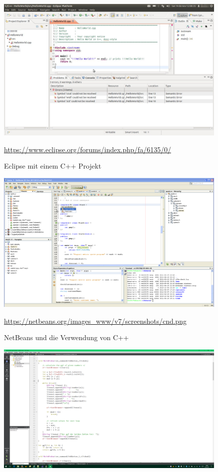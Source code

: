 \documentclass[a4paper]{report}
\begin{document}
\begin{center}
\begin{figure}
	\label{begin:ide:picts}
	\includegraphics[width = \textwidth]{01/eclipse.jpg}
	\caption{Eclipse mit einem C++ Projekt}
	\url{https://www.eclipse.org/forums/index.php/fa/6135/0/}
	\label{pic:eclipse}
\end{figure}
\begin{figure}
	\includegraphics[width = \textwidth]{01/netbeans.png}
	\caption{NetBeans und die Verwendung von C++}
	\url{https://netbeans.org/images_www/v7/screenshots/cnd.png}
	\label{pic:netbeans}
\end{figure}
\begin{figure}
	\includegraphics[width = \textwidth]{01/qt_code.png}

\end{figure}
\end{center}
\end{document}

